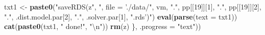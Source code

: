 \documentclass[]{tufte-book}
\newenvironment{Shaded}{}{}
\newcommand{\KeywordTok}[1]{\textcolor[rgb]{0.00,0.44,0.13}{\textbf{#1}}}
\newcommand{\DataTypeTok}[1]{\textcolor[rgb]{0.56,0.13,0.00}{#1}}
\newcommand{\DecValTok}[1]{\textcolor[rgb]{0.25,0.63,0.44}{#1}}
\newcommand{\CharTok}[1]{\textcolor[rgb]{0.25,0.44,0.63}{#1}}
\newcommand{\StringTok}[1]{\textcolor[rgb]{0.25,0.44,0.63}{#1}}
\newcommand{\NormalTok}[1]{#1}
\begin{document}
\begin{Shaded}
\begin{Highlighting}[]
\NormalTok{        txt1 <-}\StringTok{ }\KeywordTok{paste0}\NormalTok{(}\StringTok{"saveRDS(z"}\NormalTok{, }\StringTok{", file = './data/"}\NormalTok{, }
\NormalTok{            vm, }\StringTok{"."}\NormalTok{, pp[[}\DecValTok{19}\NormalTok{]][}\DecValTok{1}\NormalTok{], }\StringTok{"."}\NormalTok{, pp[[}\DecValTok{19}\NormalTok{]][}\DecValTok{2}\NormalTok{], }
            \StringTok{"."}\NormalTok{, .dist.model.par[}\DecValTok{2}\NormalTok{], }\StringTok{"."}\NormalTok{, .solver.par[}\DecValTok{1}\NormalTok{], }
            \StringTok{".rds')"}\NormalTok{)}
        \KeywordTok{eval}\NormalTok{(}\KeywordTok{parse}\NormalTok{(}\DataTypeTok{text =}\NormalTok{ txt1))}
        \KeywordTok{cat}\NormalTok{(}\KeywordTok{paste0}\NormalTok{(txt1, }\StringTok{" done!"}\NormalTok{, }\StringTok{"}\CharTok{\textbackslash{}n}\StringTok{"}\NormalTok{))}
        \KeywordTok{rm}\NormalTok{(z)}
\NormalTok{    \}, }\DataTypeTok{.progress =} \StringTok{"text"}\NormalTok{))}
\end{Highlighting}
\end{Shaded}
\end{document}

